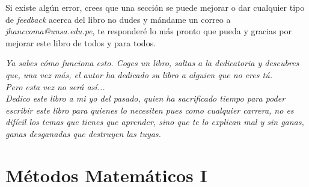 \documentclass[11pt,fleqn]{book} %
\begin{document}
\noindent Si existe algún error, crees que una sección se puede mejorar o dar cualquier tipo de \textit{feedback} acerca del libro no dudes y mándame un correo a \textit{jhanccoma@unsa.edu.pe}, te responderé lo más pronto que pueda y gracias por mejorar este libro de todos y para todos.
\clearpage
\begin{center}
    \thispagestyle{empty}
    \vspace*{\fill}
    \textit{Ya sabes cómo funciona esto. Coges un libro, saltas a la dedicatoria y descubres que, una vez más, el autor ha dedicado su libro a alguien que no eres tú.\\
    Pero esta vez no será así...\\
    Dedico este libro a mi yo del pasado, quien ha sacrificado tiempo para poder escribir este libro para quienes lo necesiten pues como cualquier carrera, no es difícil los temas que tienes que aprender, sino que te lo explican mal y sin ganas, ganas  desganadas que destruyen las tuyas.}
    \vspace*{\fill}
\end{center}
\clearpage



\pagestyle{empty} %

\tableofcontents %

\cleardoublepage %

\pagestyle{fancy} %

\part{Métodos Matemáticos I}
\end{document}
